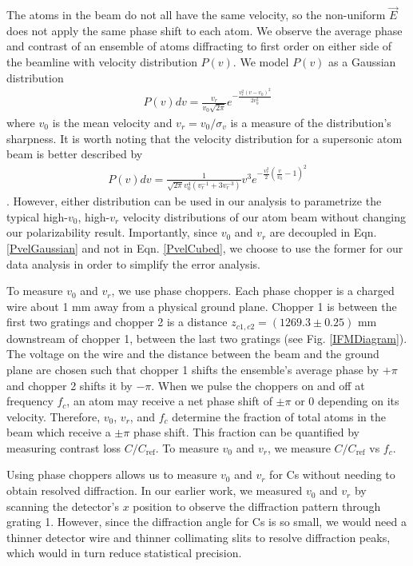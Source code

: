 \documentclass[twocolumn,prl,showpacs,superscriptaddress]{revtex4-1}   %
\newcommand{\figref}[1]{Fig. \ref{#1}}
\newcommand{\eqnref}[1]{Eqn. \eqref{#1}}
\begin{document}
The atoms in the beam do not all have the same velocity, so the non-uniform $\vec{E}$ does not apply the same phase shift to each atom.
We observe the average phase and contrast of an ensemble of atoms diffracting to first order on either side of the beamline with velocity distribution $P(v)$. 
We model $P(v)$ as a Gaussian distribution
\begin{align}
	P(v)dv = \frac{v_r}{v_0\sqrt{2\pi}}e^{-\frac{v_r^2(v-v_0)^2}{2v_0^2}}
	\label{PvelGaussian}
\end{align}
where $v_0$ is the mean velocity and $v_r = v_0/\sigma_v$ is a measure of the distribution's sharpness. It is worth noting that the velocity distribution for a supersonic atom beam is better described by
\begin{align}
	P(v)dv = \frac{1}{\sqrt{2\pi}v_0^4(v_r^{-1}+3v_r^{-3})}
	v^3
	e^{-\frac{v_r^2}{2}\left(\frac{v}{v_0}-1\right)^2}
	\label{PvelCubed}
\end{align}
\cite{Berman1997}. However, either distribution can be used in our analysis to parametrize the typical high-$v_0$, high-$v_r$ velocity distributions of our atom beam without changing our polarizability result. Importantly, since $v_0$ and $v_r$ are decoupled in \eqnref{PvelGaussian} and not in \eqnref{PvelCubed}, we choose to use the former for our data analysis in order to simplify the error analysis. 


To measure $v_0$ and $v_r$, we use phase choppers. Each phase chopper is a charged wire about 1 mm away from a physical ground plane. Chopper 1 is between the first two gratings and chopper 2 is a distance $z_{c1,c2} = (1269.3 \pm 0.25)$ mm downstream of chopper 1, between the last two gratings (see \figref{IFMDiagram}). The voltage on the wire and the distance between the beam and the ground plane are chosen such that chopper 1 shifts the ensemble's average phase by $+\pi$ and chopper 2 shifts it by $-\pi$. 
When we pulse the choppers on and off at frequency $f_c$, an atom may receive a net phase shift of $\pm\pi$ or $0$ depending on its velocity. Therefore, $v_0$, $v_r$, and $f_c$ determine the fraction of total atoms in the beam which receive a $\pm\pi$ phase shift. This fraction can be quantified by measuring contrast loss $C/C_{\mathrm{ref}}$. To measure $v_0$ and $v_r$, we measure $C/C_{\mathrm{ref}}$ vs $f_c$.

Using phase choppers allows us to measure $v_0$ and $v_r$ for Cs without needing to obtain resolved diffraction. In our earlier work, we measured $v_0$ and $v_r$ by scanning the detector's $x$ position to observe the diffraction pattern through grating 1. However, since the diffraction angle for Cs is so small, we would need a thinner detector wire and thinner collimating slits to resolve diffraction peaks, which would in turn reduce statistical precision.
\end{document}
